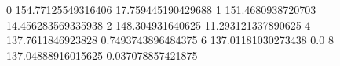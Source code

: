 0 154.77125549316406 17.759445190429688
1 151.4680938720703 14.456283569335938
2 148.304931640625 11.293121337890625
4 137.7611846923828 0.7493743896484375
6 137.01181030273438 0.0
8 137.04888916015625 0.037078857421875
